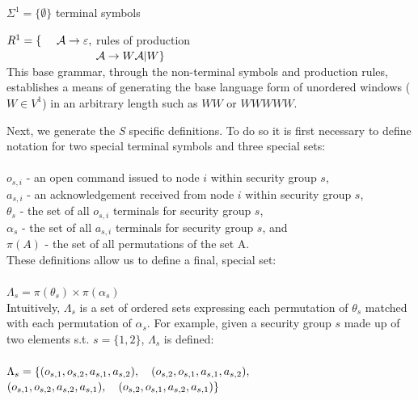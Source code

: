 \documentclass[oneside,12pt]{memoir}
\newcommand{\tab}{\hspace*{2em}}
\begin{document}
\tab $\Sigma ^1 = \{ \emptyset\}$ \hfill terminal symbols\hspace*{6.3em}

\tab $R^1 = \lbrace \hspace*{1.35em}\mathcal{A} \rightarrow \varepsilon ,$ \hfill rules of production \hspace*{6em} \\
$\tab \hspace*{5.9em} \mathcal{A}\rightarrow W\mathcal{A} |W\rbrace$\\

This base grammar, through the non-terminal symbols and production rules, establishes a means of generating the base language form of unordered windows ($W\in V^1$) in an arbitrary length such as $WW$ or $WWWWW$.

Next, we generate the \emph{S} specific definitions. To do so it is first necessary to define notation for two special terminal symbols and three special sets:\\
\\
$o_{s,i}$ - an open command issued to node $i$ within security group $s$,\\
$a_{s,i}$ - an acknowledgement received from node $i$ within security group $s$,\\
$\theta_s$ - the set of all $o_{s,i}$ terminals for security group $s$, \\
$\alpha_s$ - the set of all $a_{s,i}$ terminals for security group $s$, and \\
$\pi(A)$ - the set of all permutations of the set A.\\

These definitions allow us to define a final, special set:\\
\\
$\Lambda_s = \pi(\theta_s) \times \pi(\alpha_s)$\\

Intuitively, $\Lambda_s$ is a set of ordered sets expressing each permutation of $\theta_s$ matched with each permutation of $\alpha_s$. For example, given a security group $s$ made up of two elements s.t. $s = \{1, 2\}$, $\Lambda_s$ is defined:\\
\\
$\Lambda_s = \{ (o_{s,1}, o_{s,2}, a_{s,1}, a_{s,2}),\hspace*{1.0em} (o_{s,2}, o_{s,1}, a_{s,1}, a_{s,2}),$\\
\hspace*{3.0em}$ (o_{s,1}, o_{s,2}, a_{s,2}, a_{s,1}),\hspace*{1.0em} (o_{s,2}, o_{s,1}, a_{s,2}, a_{s,1})\}$\\
\end{document}

